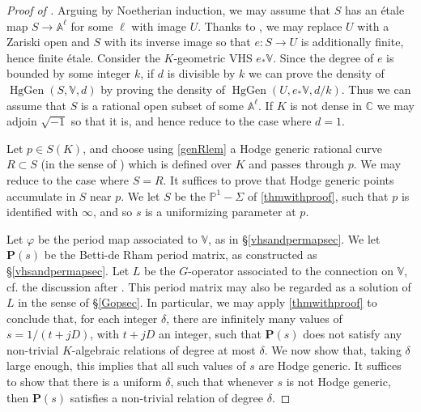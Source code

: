 \documentclass[10pt]{article}
\numberwithin{equation}{section}
\theoremstyle{plain}
\theoremstyle{definition}
\theoremstyle{remark}
\newcommand{\C}{\mathbb{C}}
\newcommand{\V}{\mathbb{V}}
\newcommand{\PP}{\mathbb{P}}
\begin{document}
\begin{proof}[Proof of ]
Arguing by Noetherian induction, we may assume that $S$ has an \'etale map $S \to \mathbb{A}^{\ell}$ for some $\ell$ with image $U$. Thanks to \cite[\href{https://stacks.math.columbia.edu/tag/02NW}{Lemma 02NW}]{stacks-project}, we may replace $U$ with a Zariski open and $S$ with its inverse image so that $e : S \to U$ is additionally finite, hence finite \'etale. Consider the $K$-geometric VHS $e_{*} \V$. Since the degree of $e$ is bounded by some integer $k$, if $d$ is divisible by $k$ we can prove the density of $\operatorname{HgGen}(S,\V,d)$ by proving the density of $\operatorname{HgGen}(U, e_{*} \V, d/k)$. Thus we can assume that $S$ is a rational open subset of some $\mathbb{A}^{\ell}$. If $K$ is not dense in $\C$ we may adjoin $\sqrt{-1}$ so that it is, and hence reduce to the case where $d = 1$.

Let $p \in S(K)$, and choose using \autoref{genRlem} a Hodge generic rational curve $R \subset S$ (in the sense of ) which is defined over $K$ and passes through $p$. We may reduce to the case where $S = R$. It suffices to prove that Hodge generic points accumulate in $S$ near $p$. We let $S$ be the $\PP^1 - \Sigma$ of \autoref{thmwithproof}, such that $p$ is identified with $\infty$, and so $s$ is a uniformizing parameter at $p$. 



Let $\varphi$ be the period map associated to $\V$, as in \S\ref{vhsandpermapsec}. We let $\mathbf{P}(s)$ be the Betti-de Rham period matrix, as constructed as \S\ref{vhsandpermapsec}. Let $L$ be the $G$-operator associated to the connection on $\V$, cf. the discussion after . This period matrix may also be regarded as a solution of $L$ in the sense of \S\ref{Gopsec}. In particular, we may apply \autoref{thmwithproof} to conclude that, for each integer $\delta$, there are infinitely many values of $s = 1/(t + jD)$, with $t+jD$ an integer, such that $\mathbf{P}(s)$ does not satisfy any non-trivial $K$-algebraic relations of degree at most $\delta$. We now show that, taking $\delta$ large enough, this implies that all such values of $s$ are Hodge generic. It suffices to show that there is a uniform $\delta$, such that whenever $s$ is not Hodge generic, then $\mathbf{P}(s)$ satisfies a non-trivial relation of degree $\delta$.


\end{proof}
\end{document}
